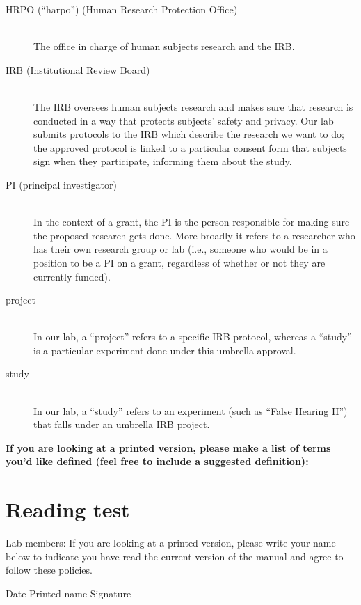 \documentclass[letterpaper,12pt,oneside]{memoir}
\begin{document}
\begin{description}

\item[HRPO (``harpo'') (Human Research Protection Office)] \hfill \\
The office in charge of human subjects research and the IRB.

\item[IRB (Institutional Review Board)] \hfill \\
The IRB oversees human subjects research and makes sure that research is conducted in a way that protects subjects' safety and privacy. Our lab submits protocols to the IRB which describe the research we want to do; the approved protocol is linked to a particular consent form that subjects sign when they participate, informing them about the study.

\item[PI (principal investigator)] \hfill \\
In the context of a grant, the PI is the person responsible for making sure the proposed research gets done. More broadly it refers to a researcher who has their own research group or lab (i.e., someone who would be in a position to be a PI on a grant, regardless of whether or not they are currently funded).

\item[project] \hfill \\
In our lab, a ``project'' refers to a specific IRB protocol, whereas a ``study'' is a particular experiment done under this umbrella approval.

\item[study] \hfill \\
In our lab, a ``study'' refers to an experiment (such as ``False Hearing II'') that falls under an umbrella IRB project.

\end{description}

\vspace{.2in}
\noindent \textbf{\large If you are looking at a printed version, please make a list of terms you'd like defined (feel free to include a suggested definition):}



%
%

\chapter*{Reading test}
\noindent Lab members: If you are looking at a printed version, please write your name below to indicate you have read the current version of the manual and agree to follow these policies.

\vspace{,5in}

\noindent Date \hspace{.5in} Printed name \hspace{1.5in} Signature\\
\end{document}
